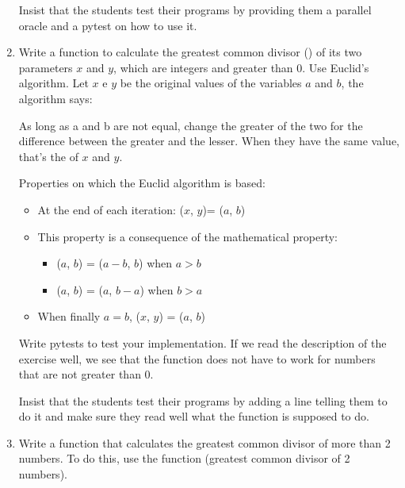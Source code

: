 \documentclass[
  fontsize=10pt,
  a4paper,
]{scrartcl}
\newenvironment{howTILEd}%
  {\begin{mdframed}[skipabove=10pt,skipbelow=10pt,backgroundcolor=pink!40]}%
  {\end{mdframed}}
\begin{document}
\begin{enumerate}
\begin{howTILEd}
Insist that the students test their programs by providing them a parallel oracle and a pytest on how to use it.
\end{howTILEd}



\item Write a function to calculate the greatest common divisor () of its two parameters $x$ and $y$, which are integers and greater than 0.
%
Use Euclid's algorithm. Let $x$ e $y$ be the original values of the variables $a$ and $b$, the algorithm says:

As long as a and b are not equal, change the greater of the two for the difference between the greater and the lesser. When they have the same value, that's the  of $x$ and $y$.

Properties on which the Euclid algorithm is based:

\begin{itemize}
\item At the end of each iteration: ($x$, $y$)= ($a$, $b$) 
\item This property is a consequence of the mathematical property:
\begin{itemize}
\item  {}($a$, $b$) = ($a - b$, $b$) when $a > b$
\item {}($a$, $b$) = ($a$, $b - a$) when $b > a$ 
\end{itemize}
\item When finally $a = b$, ($x$, $y$) = ($a$, $b$)
\end{itemize}


Write pytests to test your implementation.
If we read the description of the exercise well, we see that the function does not have to work for numbers that are not greater than 0.


\begin{howTILEd}
Insist that the students test their programs by adding a line telling them to do it and make sure they read well what the function is supposed to do.
\end{howTILEd}


\item Write a function  that calculates the greatest common divisor of more than 2 numbers. To do this, use the function  (greatest common divisor of 2 numbers).


\end{enumerate}
\end{document}
